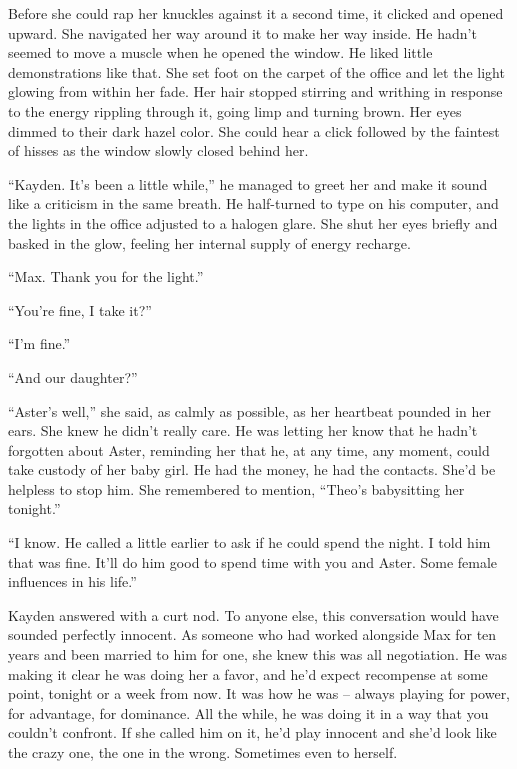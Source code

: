 Before she could rap her knuckles against it a second time, it clicked and opened upward. She navigated her way around it to make her way inside. He hadn't seemed to move a muscle when he opened the window.  He liked little demonstrations like that.  She set foot on the carpet of the office and let the light glowing from within her fade.  Her hair stopped stirring and writhing in response to the energy rippling through it, going limp and turning brown.  Her eyes dimmed to their dark hazel color.  She could hear a click followed by the faintest of hisses as the window slowly closed behind her.



``Kayden.  It's been a little while,'' he managed to greet her and make it sound like a criticism in the same breath.  He half-turned to type on his computer, and the lights in the office adjusted to a halogen glare.  She shut her eyes briefly and basked in the glow, feeling her internal supply of energy recharge.



``Max.  Thank you for the light.''



``You're fine, I take it?''



``I'm fine.''



``And our daughter?''



``Aster's well,'' she said, as calmly as possible, as her heartbeat pounded in her ears.  She knew he didn't really care.  He was letting her know that he hadn't forgotten about Aster, reminding her that he, at any time, any moment, could take custody of her baby girl.  He had the money, he had the contacts.  She'd be helpless to stop him.  She remembered to mention, ``Theo's babysitting her tonight.''



``I know.  He called a little earlier to ask if he could spend the night.  I told him that was fine.  It'll do him good to spend time with you and Aster.  Some female influences in his life.''



Kayden answered with a curt nod.  To anyone else, this conversation would have sounded perfectly innocent.  As someone who had worked alongside Max for ten years and been married to him for one, she knew this was all negotiation.  He was making it clear he was doing her a favor, and he'd expect recompense at some point, tonight or a week from now.  It was how he was – always playing for power, for advantage, for dominance.  All the while, he was doing it in a way that you couldn't confront.  If she called him on it, he'd play innocent and she'd look like the crazy one, the one in the wrong.  Sometimes even to herself.



